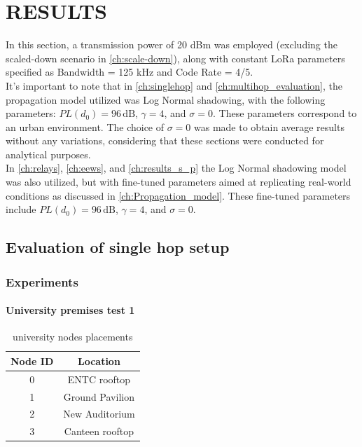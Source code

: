 \chapter{RESULTS}

\hspace{12pt} In this section, a transmission power of 20 dBm was employed (excluding the scaled-down scenario in \autoref{ch:scale-down}), along with constant LoRa parameters specified as Bandwidth = 125 kHz and Code Rate = 4/5. \\

It's important to note that in \autoref{ch:singlehop} and \autoref{ch:multihop_evaluation}, the propagation model utilized was Log Normal shadowing, with the following parameters: \(PL(d_0) = 96 \, \text{dB}\), \( \gamma = 4 \), and \( \sigma = 0 \). These parameters correspond to an urban environment. The choice of \( \sigma = 0 \) was made to obtain average results without any variations, considering that these sections were conducted for analytical purposes.\\

In \autoref{ch:relays}, \autoref{ch:eews}, and \autoref{ch:results_s_p} the Log Normal shadowing model was also utilized, but with fine-tuned parameters aimed at replicating real-world conditions as discussed in \autoref{ch:Propagation_model}. These fine-tuned parameters include \(PL(d_0) = 96 \, \text{dB}\), \( \gamma = 4 \), and \( \sigma = 0 \).
\section{Evaluation of single hop setup}\label{ch:singlehop}



\subsection{Experiments}
\label{sec:singlehop_exp}
\subsubsection{University premises test 1}


\begin{table}[ht!]
\caption{university nodes placements}
\begin{tabular}{|c|c|}
\hline
\textbf{Node ID} & \textbf{Location} \\ \hline
0                & ENTC rooftop      \\ \hline
1                & Ground Pavilion   \\ \hline
2                & New Auditorium    \\ \hline
3                & Canteen rooftop   \\ \hline
\end{tabular}
\end{table}

